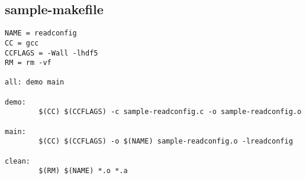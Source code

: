 \hypertarget{sample-makefile-example}{
\subsection{sample-makefile}
}


\begin{DocInclude}\begin{verbatim}NAME = readconfig
CC = gcc
CCFLAGS = -Wall -lhdf5
RM = rm -vf

all: demo main

demo:
        $(CC) $(CCFLAGS) -c sample-readconfig.c -o sample-readconfig.o

main:
        $(CC) $(CCFLAGS) -o $(NAME) sample-readconfig.o -lreadconfig 

clean:
        $(RM) $(NAME) *.o *.a 
\end{verbatim}
\end{DocInclude}
 